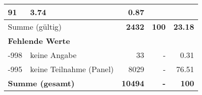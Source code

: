 \begin{longtable}{lXrrr}
       \num{91} &
       \num[round-mode=places,round-precision=2]{3.74} &
         \num[round-mode=places,round-precision=2]{0.87} \\
     \midrule
     \multicolumn{2}{l}{Summe (gültig)} &
       \textbf{\num{2432}} &
     \textbf{\num{100}} &
       \textbf{\num[round-mode=places,round-precision=2]{23.18}} \\
     \multicolumn{5}{l}{\textbf{Fehlende Werte}}\\
       -998 &
       keine Angabe &
         \num{33} &
        - &
         \num[round-mode=places,round-precision=2]{0.31} \\
       -995 &
       keine Teilnahme (Panel) &
         \num{8029} &
        - &
         \num[round-mode=places,round-precision=2]{76.51} \\
     \midrule
     \multicolumn{2}{l}{\textbf{Summe (gesamt)}} &
          \textbf{\num{10494}} &
        \textbf{-} &
        \textbf{\num{100}} \\
     \bottomrule
     \end{longtable}
     
